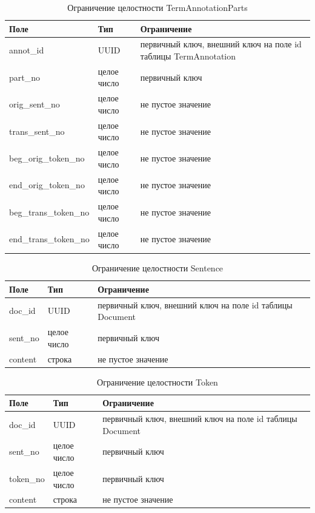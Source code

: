 \begin{table}[H]
\centering
\caption{Ограничение целостности TermAnnotationParts}
\begin{tabular}{|m{5cm}|m{3cm}|m{6cm}|}
\hline
\textbf{Поле} & \textbf{Тип} & \textbf{Ограничение} \\ \hline
annot\_id & UUID & первичный ключ, внешний ключ на поле id таблицы TermAnnotation \\ \hline
part\_no & целое число & первичный ключ \\ \hline
orig\_sent\_no & целое число & не пустое значение \\ \hline
trans\_sent\_no & целое число & не пустое значение \\ \hline
beg\_orig\_token\_no & целое число & не пустое значение \\ \hline
end\_orig\_token\_no & целое число & не пустое значение \\ \hline
beg\_trans\_token\_no & целое число & не пустое значение \\ \hline
end\_trans\_token\_no & целое число & не пустое значение \\ \hline
\end{tabular}
\label{tab:termannotparts}
\end{table}

\begin{table}[H]
\centering
\caption{Ограничение целостности Sentence}
\begin{tabular}{|m{3cm}|m{3cm}|m{6cm}|}
\hline
\textbf{Поле} & \textbf{Тип} & \textbf{Ограничение} \\ \hline
doc\_id & UUID & первичный ключ, внешний ключ на поле id таблицы Document \\ \hline
sent\_no & целое число & первичный ключ \\ \hline
content & строка & не пустое значение \\ \hline
\end{tabular}
\label{tab:sent}
\end{table}

\begin{table}[H]
\centering
\caption{Ограничение целостности Token}
\begin{tabular}{|m{3cm}|m{3cm}|m{6cm}|}
\hline
\textbf{Поле} & \textbf{Тип} & \textbf{Ограничение} \\ \hline
doc\_id & UUID & первичный ключ, внешний ключ на поле id таблицы Document \\ \hline
sent\_no & целое число & первичный ключ \\ \hline
token\_no & целое число & первичный ключ \\ \hline
content & строка & не пустое значение \\ \hline
\end{tabular}
\label{tab:token}
\end{table}


